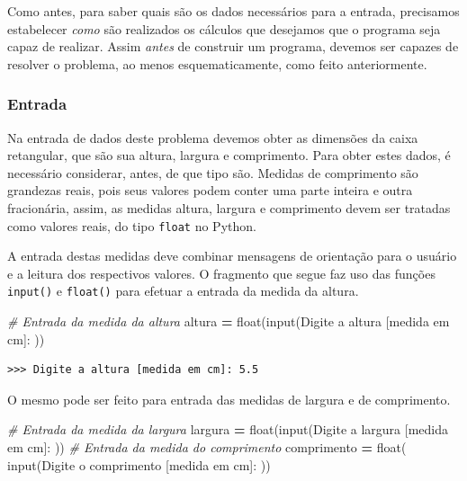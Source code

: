 \documentclass[
]{book}
\newenvironment{Shaded}{\begin{snugshade}}{\end{snugshade}}
\newcommand{\BuiltInTok}[1]{#1}
\newcommand{\CommentTok}[1]{\textcolor[rgb]{0.56,0.35,0.01}{\textit{#1}}}
\newcommand{\NormalTok}[1]{#1}
\newcommand{\OperatorTok}[1]{\textcolor[rgb]{0.81,0.36,0.00}{\textbf{#1}}}
\newcommand{\StringTok}[1]{\textcolor[rgb]{0.31,0.60,0.02}{#1}}
\begin{document}
Como antes, para saber quais são os dados necessários para a entrada, precisamos estabelecer \emph{como} são realizados os cálculos que desejamos que o programa seja capaz de realizar. Assim \emph{antes} de construir um programa, devemos ser capazes de resolver o problema, ao menos esquematicamente, como feito anteriormente.

\hypertarget{entrada-1}{%
\subsubsection{Entrada}\label{entrada-1}}

Na entrada de dados deste problema devemos obter as dimensões da caixa retangular, que são sua altura, largura e comprimento. Para obter estes dados, é necessário considerar, antes, de que tipo são. Medidas de comprimento são grandezas reais, pois seus valores podem conter uma parte inteira e outra fracionária, assim, as medidas altura, largura e comprimento devem ser tratadas como valores reais, do tipo \texttt{float} no Python.

A entrada destas medidas deve combinar mensagens de orientação para o usuário e a leitura dos respectivos valores. O fragmento que segue faz uso das funções \texttt{input()} e \texttt{float()} para efetuar a entrada da medida da altura.

\begin{Shaded}
\begin{Highlighting}[]
\CommentTok{\# Entrada da medida da altura}
\NormalTok{altura }\OperatorTok{=} \BuiltInTok{float}\NormalTok{(}\BuiltInTok{input}\NormalTok{(}\StringTok{\textquotesingle{}Digite a altura [medida em cm]: \textquotesingle{}}\NormalTok{))}
\end{Highlighting}
\end{Shaded}

\begin{verbatim}
>>> Digite a altura [medida em cm]: 5.5
\end{verbatim}

O mesmo pode ser feito para entrada das medidas de largura e de comprimento.

\begin{Shaded}
\begin{Highlighting}[]
\CommentTok{\# Entrada da medida da largura}
\NormalTok{largura }\OperatorTok{=} \BuiltInTok{float}\NormalTok{(}\BuiltInTok{input}\NormalTok{(}\StringTok{\textquotesingle{}Digite a largura [medida em cm]: \textquotesingle{}}\NormalTok{))}
\CommentTok{\# Entrada da medida do comprimento}
\NormalTok{comprimento }\OperatorTok{=} \BuiltInTok{float}\NormalTok{(}
    \BuiltInTok{input}\NormalTok{(}\StringTok{\textquotesingle{}Digite o comprimento [medida em cm]: \textquotesingle{}}\NormalTok{))}
\end{Highlighting}
\end{Shaded}
\end{document}
